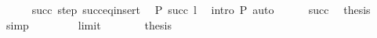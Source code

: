 \begin{isabellebody}
\ \ \ \ \isamarkupfalse%
\ succ\ step\ succ{\isacharunderscore}{\kern0pt}eq{\isacharunderscore}{\kern0pt}insert\ \isamarkupfalse%
\ {\isachardoublequoteopen}P\ {\isacharparenleft}{\kern0pt}succ\ l{\isacharparenright}{\kern0pt}{\isachardoublequoteclose}\ \isamarkupfalse%
\ {\isacharparenleft}{\kern0pt}intro\ P{\isacharparenleft}{\kern0pt}{}{\isacharparenright}{\kern0pt}{\isacharparenright}{\kern0pt}\ auto\isanewline
\ \ \ \ \isamarkupfalse%
\ succ\ \isamarkupfalse%
\ {\isacharquery}{\kern0pt}thesis\ \isamarkupfalse%
\ simp\isanewline
\ \ \isamarkupfalse%
\isanewline
\ \ \ \ \isamarkupfalse%
\ limit\isanewline
\ \ \ \ \isamarkupfalse%
\ \isamarkupfalse%
\ {\isacharquery}{\kern0pt}thesis\ \isamarkupfalse%
\isanewline
\ \ \isamarkupfalse%
\isanewline
{}\isamarkupfalse%
%
\endisatagproof
{\isafoldproof}%
%
\isadelimproof
\isanewline
%
\endisadelimproof
\isanewline
{}\isamarkupfalse%
\isanewline
%
\isadelimtheory
\isanewline
%
\endisadelimtheory
%
\isatagtheory
{}\isamarkupfalse%
%
\endisatagtheory
{\isafoldtheory}%
%
\isadelimtheory
%
\endisadelimtheory
%
\end{isabellebody}%
\endinput
